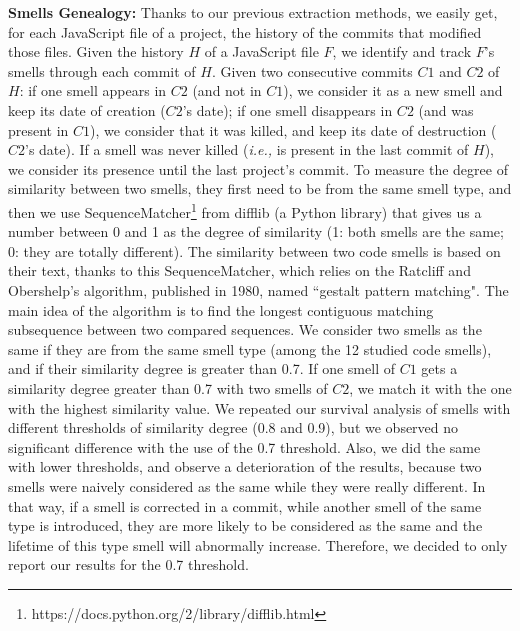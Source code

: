 \documentclass[smallcondensed]{svjour3}
\newcommand{\ie}{{\textit{i.e.,}}}
\newcommand{\mytitle}[1]{\textbf{#1:}}
\begin{document}
\mytitle{Smells Genealogy} Thanks to our previous extraction methods, we easily get, for each JavaScript file of a project, the history of the commits that modified those files. Given the history $H$ of a JavaScript file $F$, we identify and track $F$'s smells through each commit of $H$. Given two consecutive commits $C1$ and $C2$ of $H$: if one smell appears in $C2$ (and not in $C1$), we consider it as a new smell and keep its date of creation ($C2$'s date); if one smell disappears in $C2$ (and was present in $C1$), we consider that it was killed, and keep its date of destruction ($C2$'s date). If a smell was never killed (\ie{} is present in the last commit of $H$), we consider its presence until the last project's commit. To measure the degree of similarity between two smells, they first need to be from the same smell type, and then we use SequenceMatcher\footnote{https://docs.python.org/2/library/difflib.html} from difflib (a Python library) that gives us a number between 0 and 1 as the degree of similarity (1: both smells are the same; 0: they are totally different). {\color{blue}The similarity between two code smells is based on their text, thanks to this SequenceMatcher, which relies on the Ratcliff and Obershelp's algorithm, published in 1980, named ``gestalt pattern matching". The main idea of the algorithm is to find the longest contiguous matching subsequence between two compared sequences.} We consider two smells as the same if they are from the same smell type (among the 12 studied code smells), and if their similarity degree is greater than 0.7. If one smell of $C1$ gets a similarity degree greater than 0.7 with two smells of $C2$, we match it with the one with the highest similarity value. %
We repeated our survival analysis of smells with different thresholds of similarity degree (0.8 and 0.9), but we observed no significant difference with the use of the 0.7 threshold. {\color{blue}Also, we did the same with lower thresholds, and observe a deterioration of the results, because two smells were naively considered as the same while they were really different. In that way, if a smell is corrected in a commit, while another smell of the same type is introduced, they are more likely to be considered as the same and the lifetime of this type smell will abnormally increase.} Therefore, we decided to only report our results for the 0.7 threshold. %
\end{document}
